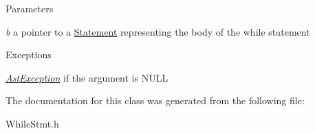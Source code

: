 \begin{DoxyParams}{Parameters}
\item[{\em b}]a pointer to a \hyperlink{classStatement}{Statement} representing the body of the while statement \end{DoxyParams}

\begin{DoxyExceptions}{Exceptions}
\item[{\em \hyperlink{classAstException}{AstException}}]if the argument is NULL \end{DoxyExceptions}


The documentation for this class was generated from the following file:\begin{DoxyCompactItemize}
\item 
WhileStmt.h\end{DoxyCompactItemize}
